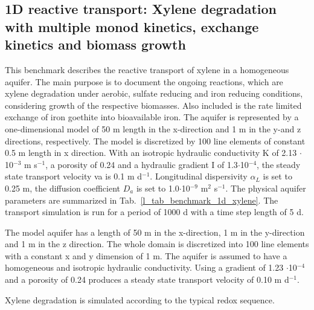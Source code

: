 

\subsection [Xylene degradation (1D)]{1D reactive transport: Xylene degradation with multiple monod kinetics, exchange kinetics and biomass growth}
\label{l_s_benchmark_1d_xylene_deg}

This benchmark describes the reactive transport of xylene in a homogeneous aquifer. The main purpose is to document the ongoing reactions, which are xylene degradation under aerobic, sulfate reducing and iron reducing conditions, considering growth of the respective biomasses. Also included is the rate limited exchange of iron goethite into bioavailable iron. The aquifer is represented by a one-dimensional model of 50 m length in the x-direction and 1 m in the y-and z directions, respectively. The model is discretized by 100 line elements of constant 0.5 m length in x direction. With an isotropic hydraulic conductivity K of 2.13 $\cdot$10$^{-3}$ m s$^{-1}$, a porosity of 0.24 and a hydraulic gradient I of 1.3$\cdot$10$^{-4}$, the steady state transport velocity va is 0.1 m d$^{-1}$. Longitudinal dispersivity  $\alpha_L$ is set to 0.25 m, the diffusion coefficient $D_a$ is set to 1.0$\cdot$10$^{-9}$ m$^2$ s$^{-1}$. The physical aquifer parameters are summarized in Tab.~\ref{l_tab_benchmark_1d_xylene}. The transport simulation is run for a period of 1000 d with a time step length of 5 d.

The model aquifer has a length of 50 m in the x-direction, 1 m in the y-direction and 1 m in the z direction. The whole domain is discretized into 100 line elements with a constant x and y dimension of 1 m.
The aquifer is assumed to have a homogeneous and isotropic hydraulic conductivity. Using a gradient of 1.23 $\cdot$10$^{-4}$ and a porosity of 0.24 produces a steady state transport velocity of 0.10 m d$^{-1}$.

Xylene degradation is simulated according to the typical redox sequence.


